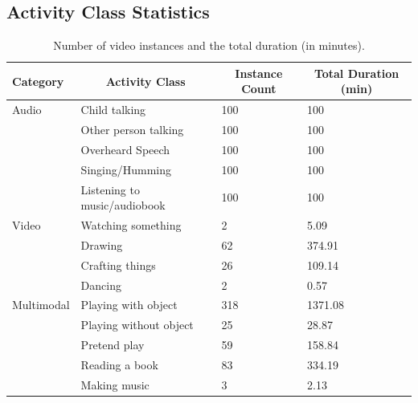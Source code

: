 \documentclass[
  man,floatsintext]{apa6}
\begin{document}
\subsection{Activity Class Statistics}\label{activity-class-statistics}

\begin{table}[tbp]

\begin{center}
\begin{threeparttable}

\caption{\label{tab:activity-classes-statistics}Number of video instances and the total duration (in minutes).}

\begin{tabular}{llll}
\toprule
Category & \multicolumn{1}{c}{Activity Class} & \multicolumn{1}{c}{Instance Count} & \multicolumn{1}{c}{Total Duration (min)}\\
\midrule
Audio & Child talking & 100 & 100\\
 & Other person talking & 100 & 100\\
 & Overheard Speech & 100 & 100\\
 & Singing/Humming & 100 & 100\\
 & Listening to music/audiobook & 100 & 100\\
Video & Watching something & 2 & 5.09\\
 & Drawing & 62 & 374.91\\
 & Crafting things & 26 & 109.14\\
 & Dancing & 2 & 0.57\\
Multimodal & Playing with object & 318 & 1371.08\\
 & Playing without object & 25 & 28.87\\
 & Pretend play & 59 & 158.84\\
 & Reading a book & 83 & 334.19\\
 & Making music & 3 & 2.13\\
\bottomrule
\end{tabular}

\end{threeparttable}
\end{center}

\end{table}
\end{document}
